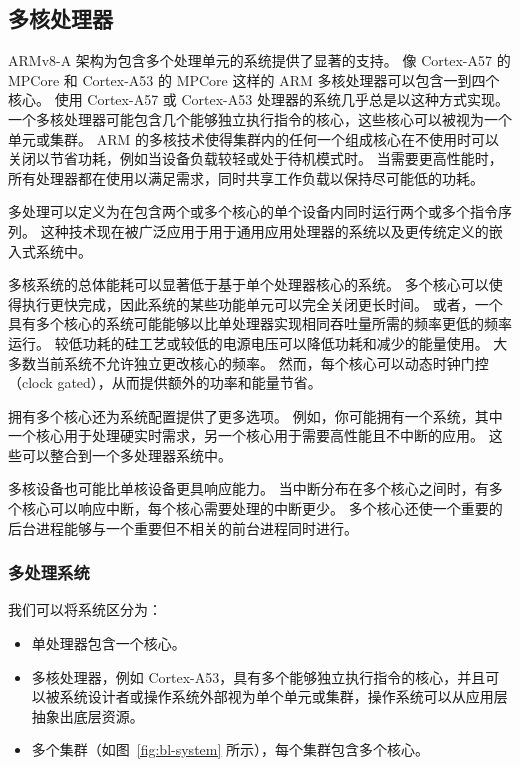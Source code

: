 \subsection{多核处理器}

ARMv8-A 架构为包含多个处理单元的系统提供了显著的支持。
像 Cortex-A57 的 MPCore 和 Cortex-A53 的 MPCore 这样的 ARM 多核处理器可以包含一到四个核心。
使用 Cortex-A57 或 Cortex-A53 处理器的系统几乎总是以这种方式实现。
一个多核处理器可能包含几个能够独立执行指令的核心，这些核心可以被视为一个单元或集群。
ARM 的多核技术使得集群内的任何一个组成核心在不使用时可以关闭以节省功耗，例如当设备负载较轻或处于待机模式时。
当需要更高性能时，所有处理器都在使用以满足需求，同时共享工作负载以保持尽可能低的功耗。

多处理可以定义为在包含两个或多个核心的单个设备内同时运行两个或多个指令序列。
这种技术现在被广泛应用于用于通用应用处理器的系统以及更传统定义的嵌入式系统中。

多核系统的总体能耗可以显著低于基于单个处理器核心的系统。
多个核心可以使得执行更快完成，因此系统的某些功能单元可以完全关闭更长时间。
或者，一个具有多个核心的系统可能能够以比单处理器实现相同吞吐量所需的频率更低的频率运行。
较低功耗的硅工艺或较低的电源电压可以降低功耗和减少的能量使用。
大多数当前系统不允许独立更改核心的频率。
然而，每个核心可以动态时钟门控（clock gated），从而提供额外的功率和能量节省。

拥有多个核心还为系统配置提供了更多选项。
例如，你可能拥有一个系统，其中一个核心用于处理硬实时需求，另一个核心用于需要高性能且不中断的应用。
这些可以整合到一个多处理器系统中。

多核设备也可能比单核设备更具响应能力。
当中断分布在多个核心之间时，有多个核心可以响应中断，每个核心需要处理的中断更少。
多个核心还使一个重要的后台进程能够与一个重要但不相关的前台进程同时进行。

\subsubsection{多处理系统}

我们可以将系统区分为：

\begin{itemize}
  \item
  单处理器包含一个核心。
  \item
  多核处理器，例如 Cortex-A53，具有多个能够独立执行指令的核心，并且可以被系统设计者或操作系统外部视为单个单元或集群，操作系统可以从应用层抽象出底层资源。
  \item
  多个集群（如图~\ref{fig:bl-system} 所示），每个集群包含多个核心。
\end{itemize}

